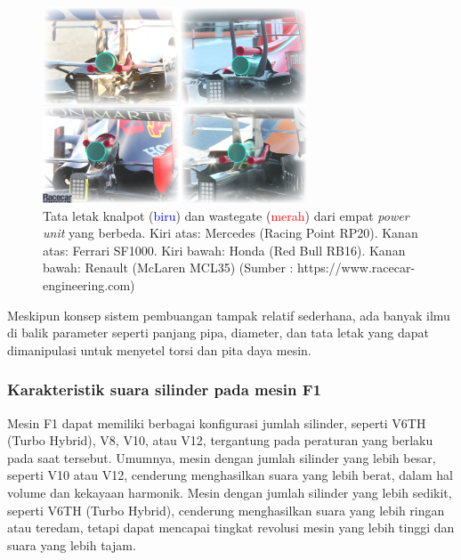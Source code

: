 \begin{figure}[htbp]
    \centering \footnotesize
    \includegraphics[width=0.7\textwidth]{images/F1-Exhaust-tailpipe-comparison-1024x759.jpg}
    \caption{Tata letak knalpot (\textcolor{blue}{biru}) dan wastegate (\textcolor{red}{merah}) dari empat \textit{power unit} yang berbeda. Kiri atas: Mercedes (Racing Point RP20). Kanan atas: Ferrari SF1000. Kiri bawah: Honda (Red Bull RB16). Kanan bawah: Renault (McLaren MCL35) (Sumber : https://www.racecar-engineering.com) }
    \label{fig:The tailpipe (blue) and wastegate (red) layouts of the four different power units. Top left: Mercedes (Racing Point RP20). Top right: Ferrari SF1000. Bottom left: Honda (Red Bull RB16). Bottom right: Renault (McLaren MCL35)}
\end{figure}

Meskipun konsep sistem pembuangan tampak relatif sederhana, ada banyak ilmu di balik parameter seperti panjang pipa, diameter, dan tata letak yang dapat dimanipulasi untuk menyetel torsi dan pita daya mesin.

\subsubsection{Karakteristik suara silinder pada mesin F1}

Mesin F1 dapat memiliki berbagai konfigurasi jumlah silinder, seperti V6TH (Turbo Hybrid), V8, V10, atau V12, tergantung pada peraturan yang berlaku pada saat tersebut. Umumnya, mesin dengan jumlah silinder yang lebih besar, seperti V10 atau V12, cenderung menghasilkan suara yang lebih berat, dalam hal volume dan kekayaan harmonik. Mesin dengan jumlah silinder yang lebih sedikit, seperti V6TH (Turbo Hybrid), cenderung menghasilkan suara yang lebih ringan atau teredam, tetapi dapat mencapai tingkat revolusi mesin yang lebih tinggi dan suara yang lebih tajam.

